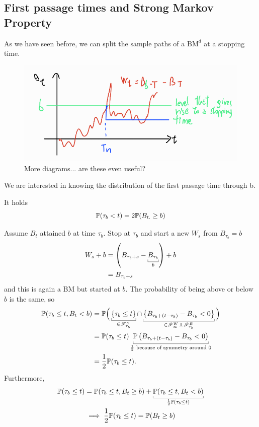 \documentclass[12pt]{report}
\begin{document}
\subsection{First passage times and Strong Markov Property}
As we have seen before, we can split the sample paths of a $\mathrm{BM}^{d}$ at a stopping time.
\begin{figure}[h]
	\centering
	\includegraphics[width=0.7\linewidth]{img/screenshot021}
	\caption{More diagrams... are these even useful?}
	\label{fig:screenshot021}
\end{figure}
We are interested in knowing the distribution of the first passage time through b.
\begin{theorem}
	It holds
	\begin{equation*}
		\mathbb{P}(\tau_{b}<t)=2\mathbb{P}(B_{t.}\geq b)
	\end{equation*}
\end{theorem}
\begin{fancyproof}
	Assume $B_{t}$ attained $b$ at time $\tau_{b}$. Stop at $\tau_{b}$ and start a new \bwm{} $W_{s}$ from $B_{\tau_{b}}=b$
	\begin{align*}
		W_{s}+b&=\left(B_{\tau_{b}+s}-\ubracketthin{B_{\tau_{b}}}_{b}\right)+b\\
		&=B_{\tau_{b}+s}
	\end{align*}
	and this is again a BM but started at $b$. The probability of being above or below $b$ is the same, so
	\begin{align*}
		\pr(\tau_{b}\leq t,B_{t}<b)&=\pr\Big(\ubracketthin{\left\{\tau_{b}\leq t\right\}}_{\in\F^{B}_{\tau_{b}}}\cap\ubracketthin{\left\{B_{\tau_{b}+(t-\tau_{b})}-B_{\tau_{b}}<0\right\}}_{\in\F^{W}_{\infty}\independent\F^{B}_{\tau_{b}}}\Big)\\
		&=\pr(\tau_{b}\leq t)\ubracketthin{\pr\left(B_{\tau_{b}+(t-\tau_{b})}-B_{\tau_{b}}<0\right)}_{\unmezz\text{ because of symmetry around 0}}\\
		&=\unmezz\pr(\tau_{b}\leq t).
	\end{align*}
	Furthermore,
	\begin{align*}
		\pr(\tau_{b}\leq t)&=\pr(\tau_{b}\leq t, B_{t}\geq b)+\ubracketthin{\pr(\tau_{b}\leq t,B_{t}<b)}_{\unmezz\pr(\tau_{b}\leq t)}\\
		&\implies\unmezz\pr(\tau_{b}\leq t)=\pr(B_{t}\geq b)
	\end{align*}
\end{fancyproof}
\end{document}
